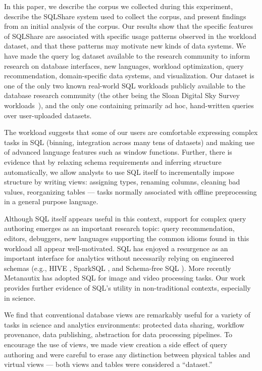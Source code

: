 \documentclass{sig-alternate}
\newcommand{\note}[2]{{\color{#1} {#2}}}
\newcommand{\reviewmeta}[1]{\note{black}{#1}}
\newcommand{\sqlshare}{SQLShare}
\begin{document}
In this paper, we describe the corpus we collected during this experiment, describe the \sqlshare{} system used to collect the corpus, and present findings from an initial analysis of the corpus. 
Our results show that the specific features of \sqlshare{} are associated with specific usage patterns observed in the workload dataset, and that these patterns \reviewmeta{may motivate new kinds of data systems.}
We have made the query log dataset available to the research community to inform research on database interfaces, new languages, workload optimization, query recommendation, domain-specific data systems, and visualization.  Our dataset is one of the only two known real-world SQL workloads publicly available to the database research community (the other being the Sloan Digital Sky Survey workloads~\cite{kent1994sloan}), and the only one containing primarily ad hoc, hand-written queries over user-uploaded datasets.

\reviewmeta{The workload suggests that some of our users are comfortable expressing complex tasks in SQL (binning, integration across many tens of datasets) and making use of advanced language features such as window functions.
Further, there is evidence that by relaxing schema requirements and inferring structure automatically, we allow analysts to use SQL itself to incrementally impose structure by writing views: assigning types, renaming columns, cleaning bad values, reorganizing tables --- tasks normally associated with offline preprocessing in a general purpose language.}

Although SQL itself appears useful in this context, support for complex query authoring emerges as an important research topic:
query recommendation, editors, debuggers, new languages supporting the common idioms found in this workload all appear well-motivated. \reviewmeta{SQL has enjoyed a resurgence as an important interface for analytics without necessarily relying on engineered schemas (e.g., HIVE \cite{hivesql}, SparkSQL \cite{armbrust2015spark}, and Schema-free SQL \cite{schemafreesql}). More recently Metanautix \cite{metanautix} has adopted SQL for image and video processing tasks. 
Our work provides further evidence of SQL's utility in non-traditional contexts, especially in science.}

We find that conventional database views are remarkably useful for a variety of tasks in science and analytics environments: protected data sharing, workflow provenance, data publishing, abstraction for data processing pipelines.  To encourage the use of views, we made view creation a side effect of query authoring and were careful to erase any distinction between physical tables and virtual views --- both views and tables were considered a ``dataset.''
\end{document}
